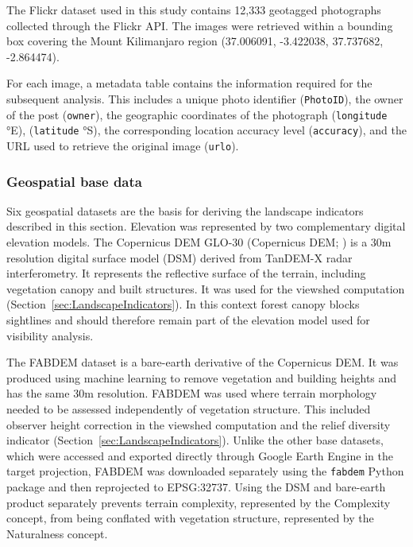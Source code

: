 \documentclass[11pt]{article}
\renewcommand{\_}{\textunderscore\allowbreak{}}
\begin{document}
The Flickr dataset used in this study contains 12{,}333 geotagged photographs collected through the Flickr API. The images were retrieved within a bounding box covering the Mount Kilimanjaro region (37.006091, -3.422038, 37.737682, -2.864474).

For each image, a metadata table contains the information required for the subsequent analysis. This includes a unique photo identifier (\texttt{Photo\_ID}), the owner of the post (\texttt{owner}), the geographic coordinates of the photograph  (\texttt{longitude} °E), (\texttt{latitude} °S), the corresponding location accuracy level (\texttt{accuracy}), and the URL used to retrieve the original image (\texttt{url\_o}).


\subsubsection{Geospatial base data}

Six geospatial datasets are the basis for deriving the landscape indicators described in this section. Elevation was represented by two complementary digital elevation models. The Copernicus DEM GLO-30 (Copernicus DEM; \citep{esa_copernicus_2024}) is a 30m resolution digital surface model (DSM) derived from TanDEM-X radar interferometry. It represents the reflective surface of the terrain, including vegetation canopy and built structures. It was used for the viewshed computation (Section~\ref{sec:LandscapeIndicators}). In this context forest canopy blocks sightlines and should therefore remain part of the elevation model used for visibility analysis.

The FABDEM dataset \citep{hawker_fabdem_2022} is a bare-earth derivative of the Copernicus DEM. It was produced using machine learning to remove vegetation and building heights and has the same 30m resolution. FABDEM was used where terrain morphology needed to be assessed independently of vegetation structure. This included observer height correction in the viewshed computation and the relief diversity indicator (Section~\ref{sec:LandscapeIndicators}). Unlike the other base datasets, which were accessed and exported directly through Google Earth Engine \citep{gorelick_google_2017} in the target projection, FABDEM was downloaded separately using the \texttt{fabdem} Python package and then reprojected to EPSG:32737. Using the DSM and bare-earth product separately prevents terrain complexity, represented by the Complexity concept, from being conflated with vegetation structure, represented by the Naturalness concept.
\end{document}
